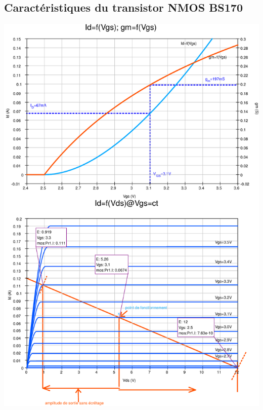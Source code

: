 \documentclass{../template/tp}
\begin{document}
\subsection{Caractéristiques du transistor NMOS BS170}
\label{anx:mos_doc}
\begin{center}
{\includegraphics[width=15cm]{carac_mos_2k16_corr-crop.pdf}\vspace*{-5cm}}%

\end{center}
\end{document}
